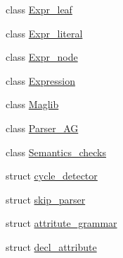\begin{CompactItemize}
\item 
class \hyperlink{classgenevalmag_1_1Expr__leaf}{Expr\_\-leaf}
\item 
class \hyperlink{classgenevalmag_1_1Expr__literal}{Expr\_\-literal}
\item 
class \hyperlink{classgenevalmag_1_1Expr__node}{Expr\_\-node}
\item 
class \hyperlink{classgenevalmag_1_1Expression}{Expression}
\item 
class \hyperlink{classgenevalmag_1_1Maglib}{Maglib}
\item 
class \hyperlink{classgenevalmag_1_1Parser__AG}{Parser\_\-AG}
\item 
class \hyperlink{classgenevalmag_1_1Semantics__checks}{Semantics\_\-checks}
\item 
struct \hyperlink{structgenevalmag_1_1cycle__detector}{cycle\_\-detector}
\item 
struct \hyperlink{structgenevalmag_1_1skip__parser}{skip\_\-parser}
\item 
struct \hyperlink{structgenevalmag_1_1attritute__grammar}{attritute\_\-grammar}
\item 
struct \hyperlink{structgenevalmag_1_1decl__attribute}{decl\_\-attribute}
\end{CompactItemize}
